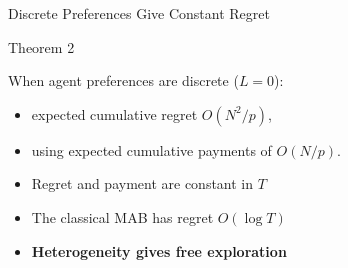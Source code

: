 \documentclass[serif]{beamer}
\begin{document}


\begin{frame}{\large{Discrete Preferences Give Constant Regret}}
\begin{alertblock}{Theorem 2}

When agent preferences are discrete ($L=0$):
\begin{itemize}
\item expected cumulative regret $O (N^2/p)$,
\item using expected cumulative payments of $O(N/p)$.
\end{itemize}
\end{alertblock}

\begin{itemize}
\item Regret and payment are constant in $T$
\item The classical MAB has regret $O(\log T)$
\item \textbf{Heterogeneity gives free exploration}
\end{itemize}

\end{frame}



%
%


\end{document}
